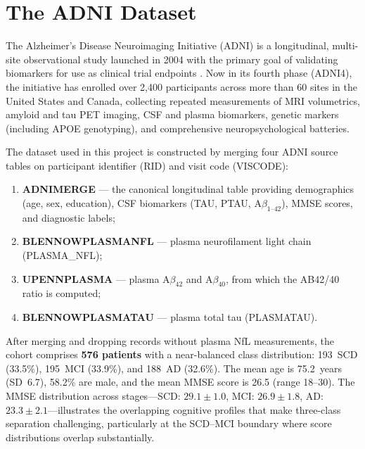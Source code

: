 \section{The ADNI Dataset}
\label{sec:adni}

The Alzheimer's Disease Neuroimaging Initiative (ADNI) is a longitudinal,
multi-site observational study launched in 2004 with the primary goal of
validating biomarkers for use as clinical trial endpoints
\citep{weiner2017adni}. Now in its fourth phase (ADNI4), the initiative has
enrolled over 2{,}400 participants across more than 60 sites in the United
States and Canada, collecting repeated measurements of MRI volumetrics, amyloid
and tau PET imaging, CSF and plasma biomarkers, genetic markers (including APOE
genotyping), and comprehensive neuropsychological batteries.

The dataset used in this project is constructed by merging four ADNI source
tables on participant identifier (RID) and visit code (VISCODE):

\begin{enumerate}[nosep]
  \item \textbf{ADNIMERGE} --- the canonical longitudinal table providing
    demographics (age, sex, education), CSF biomarkers (TAU, PTAU,
    A$\beta_{1\text{--}42}$), MMSE scores, and diagnostic labels;
  \item \textbf{BLENNOWPLASMANFL} --- plasma neurofilament light chain
    (PLASMA\_NFL);
  \item \textbf{UPENNPLASMA} --- plasma A$\beta_{42}$ and A$\beta_{40}$, from
    which the AB42/40 ratio is computed;
  \item \textbf{BLENNOWPLASMATAU} --- plasma total tau (PLASMATAU).
\end{enumerate}

After merging and dropping records without plasma NfL measurements, the cohort
comprises \textbf{576 patients} with a near-balanced class distribution:
193~SCD (33.5\%), 195~MCI (33.9\%), and 188~AD (32.6\%). The mean age is
75.2~years (SD~6.7), 58.2\% are male, and the mean MMSE score is 26.5
(range 18--30). The MMSE distribution across stages---SCD: $29.1 \pm 1.0$,
MCI: $26.9 \pm 1.8$, AD: $23.3 \pm 2.1$---illustrates the overlapping
cognitive profiles that make three-class separation challenging, particularly
at the SCD--MCI boundary where score distributions overlap substantially.


